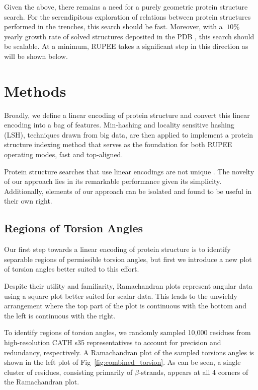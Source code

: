 \documentclass[10pt,letterpaper]{article}
\renewcommand{\figurename}{Fig}
\begin{document}
Given the above, there remains a need for a purely geometric protein structure search.
For the serendipitous exploration of relations between protein structures performed in the trenches, this search should be fast. 
Moreover, with a $~10\%$ yearly growth rate of solved structures deposited in the PDB \cite{gkw1000}, this search should be scalable. 
At a minimum, RUPEE takes a significant step in this direction as will be shown below. 

\section*{Methods}

Broadly, we define a linear encoding of protein structure and convert this linear encoding into a bag of features. 
Min-hashing and locality sensitive hashing (LSH), techniques drawn from big data, are then applied to implement a protein structure indexing method that serves as the foundation for both RUPEE operating modes, fast and top-aligned. 

Protein structure searches that use linear encodings are not unique \cite{Carpentier2005,Daniluk2011,Ritchie2012}.
The novelty of our approach lies in its remarkable performance given its simplicity. 
Additionally, elements of our approach can be isolated and found to be useful in their own right. 

\subsection*{Regions of Torsion Angles}

Our first step towards a linear encoding of protein structure is to identify separable regions of permissible torsion angles,
but first we introduce a new plot of torsion angles better suited to this effort. 

Despite their utility and familiarity, Ramachandran plots \cite{Ramachandran1968} represent angular data using a square plot better suited for scalar data.
This leads to the unwieldy arrangement where the top part of the plot is continuous with the bottom and the left is continuous with the right. 

To identify regions of torsion angles, we randomly sampled 10,000 residues from high-resolution CATH s35 representatives to account for precision and redundancy, respectively. 
A Ramachandran plot of the sampled torsions angles is shown in the left plot of \figurename~\ref{fig:combined_torsion}. 
As can be seen, a single cluster of residues, consisting primarily of $\beta$-strands, appears at all 4 corners of the Ramachandran plot.
\end{document}
